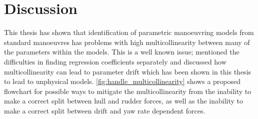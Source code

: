 \chapter{Discussion\label{ch:discussion}}
This thesis has shown that identification of parametric manoeuvring models from standard manoeuvres has problems with high multicollinearity between many of the parameters within the models.
This is a well known issue; \textcite{yoonIdentificationHydrodynamicCoefficients2003} mentioned the difficulties in finding regression coefficients separately and \textcite{wangQuantifyingMulticollinearityShip2018} discussed how multicollinearity can lead to parameter drift which has been shown in this thesis to lead to unphysical models.
\autoref{fig:handle_multicollinearity} shows a proposed flowchart for possible ways to mitigate the multicollinearity from the inability to make a correct split between hull and rudder forces, as well as the inability to make a correct split between drift and yaw rate dependent forces.

